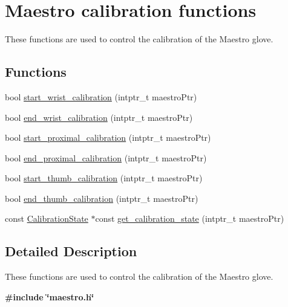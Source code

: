 \hypertarget{group__glove_calibration}{}\section{Maestro calibration functions}
\label{group__glove_calibration}


These functions are used to control the calibration of the Maestro glove.  


\subsection*{Functions}
\begin{DoxyCompactItemize}
\item 
bool \hyperlink{group__glove_calibration_ga7a6d895e59fe7a4f554b05ab067087cc}{start\+\_\+wrist\+\_\+calibration} (intptr\+\_\+t maestro\+Ptr)
\item 
bool \hyperlink{group__glove_calibration_ga4528575643eb59c92277338516679588}{end\+\_\+wrist\+\_\+calibration} (intptr\+\_\+t maestro\+Ptr)
\item 
bool \hyperlink{group__glove_calibration_ga8aa9f0c942b42299bc16440ce3d2c785}{start\+\_\+proximal\+\_\+calibration} (intptr\+\_\+t maestro\+Ptr)
\item 
bool \hyperlink{group__glove_calibration_gaca292cd71d6b63a803381ba9a43c3d85}{end\+\_\+proximal\+\_\+calibration} (intptr\+\_\+t maestro\+Ptr)
\item 
bool \hyperlink{group__glove_calibration_ga8d3e246642b4dbb70be016ad320cc320}{start\+\_\+thumb\+\_\+calibration} (intptr\+\_\+t maestro\+Ptr)
\item 
bool \hyperlink{group__glove_calibration_gaab1a5c7b6a32fa01bfad60f964065355}{end\+\_\+thumb\+\_\+calibration} (intptr\+\_\+t maestro\+Ptr)
\item 
const \hyperlink{struct_calibration_state}{Calibration\+State} $\ast$const \hyperlink{group__glove_calibration_gabdcc329a1b06cd17988398aabbbb74c2}{get\+\_\+calibration\+\_\+state} (intptr\+\_\+t maestro\+Ptr)
\end{DoxyCompactItemize}


\subsection{Detailed Description}
These functions are used to control the calibration of the Maestro glove. 

{\bfseries {\ttfamily \#include \char`\"{}maestro.\+h\char`\"{}}}

